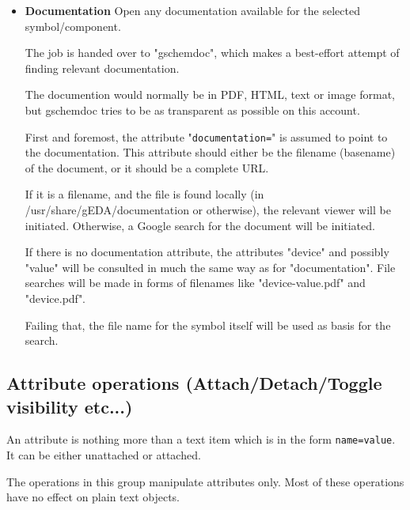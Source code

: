 \documentclass{article}
\begin{document}
\begin{itemize}
\item {\bf Documentation} Open any documentation available for the
  selected symbol/component.
  
  The job is handed over to "gschemdoc", which makes a best-effort
  attempt of finding relevant documentation.
  
  The documention would normally be in PDF, HTML, text or image
  format, but gschemdoc tries to be as transparent as possible on this
  account.
  
  First and foremost, the attribute "{\tt documentation=}" is assumed to
  point to the documentation. This attribute should either be the
  filename (basename) of the document, or it should be a complete URL.
  
  If it is a filename, and the file is found locally (in
  /usr/share/gEDA/documentation or otherwise), the relevant viewer
  will be initiated. Otherwise, a Google search for the document will
  be initiated.
  
  If there is no documentation attribute, the attributes "device" and
  possibly "value" will be consulted in much the same way as for
  "documentation". File searches will be made in forms of filenames
  like "device-value.pdf" and "device.pdf".
  
  Failing that, the file name for the symbol itself will be used as
  basis for the search.

\end{itemize}

\subsection{Attribute operations (Attach/Detach/Toggle visibility etc...)}
An attribute is nothing more than a text item which is in the form
{\tt name=value}.  It can be either unattached or attached.

The operations in this group manipulate attributes only.
Most of these operations have no effect on plain text objects.
\end{document}
